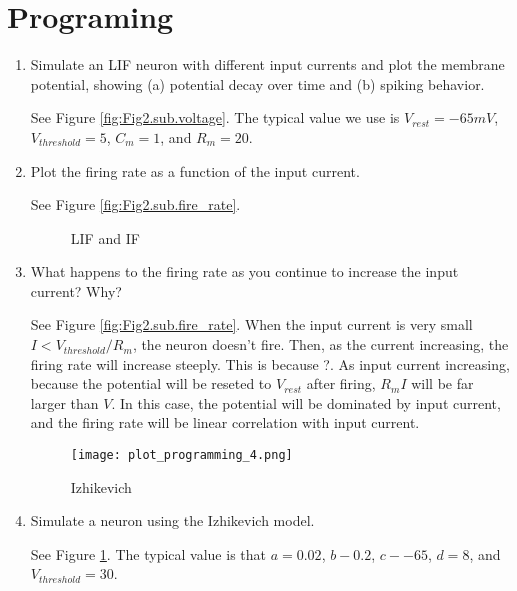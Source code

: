 \documentclass[11pt]{article}
\begin{document}
	\section*{Programing}
	\begin{enumerate}
		\item Simulate an LIF neuron with different input currents and plot the membrane potential, showing (a) potential decay over time and (b) spiking behavior.

        \cite{Ermentrout_2010}
		See Figure \ref{fig:Fig2.sub.voltage}. The typical value we use is $V_{rest} = -65 mV$, $V_{threshold} = 5$, $C_m = 1$, and $R_m = 20$. 
		
		\item Plot the firing rate as a function of the input current.
		
		See Figure \ref{fig:Fig2.sub.fire_rate}.
		
		\begin{figure}[htb]
			\centering
			\caption{LIF and IF}
		\end{figure}
		
		\item What happens to the firing rate as you continue to increase the input current? Why?
		
		See Figure \ref{fig:Fig2.sub.fire_rate}. When the input current is very small $I < V_{threshold}/R_m$, the neuron doesn't fire. Then, as the current increasing, the firing rate will increase steeply. This is because ?. As input current increasing, because the potential will be reseted to $V_{rest}$ after firing, $R_mI$ will be far larger than $V$. In this case, the potential will be dominated by input current, and the firing rate will be linear correlation with input current.
		
		\begin{figure}[htb]
			\centering
			\texttt{[image: plot\_programming\_4.png]}
			\caption{Izhikevich}
			\label{fig:Fig3.Izh}
		\end{figure}	
		\item Simulate a neuron using the Izhikevich model.
		
		See Figure \ref{fig:Fig3.Izh}. The typical value is that $a = 0.02$, $b - 0.2$, $c - -65$, $d = 8$, and $V_{threshold} = 30$.
		

\end{enumerate}
\end{document}
